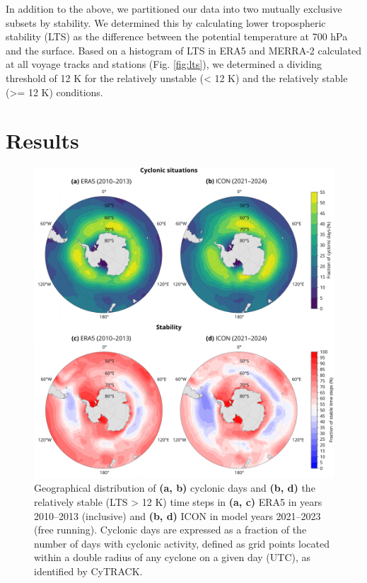 \documentclass[12pt,a4paper]{article}
\begin{document}
In addition to the above, we partitioned our data into two mutually exclusive
subsets by stability. We determined this by calculating lower tropospheric
stability (LTS) as the difference between the potential temperature at 700 hPa
and the surface.  Based on a histogram of LTS in ERA5 and MERRA-2 calculated at
all voyage tracks and stations (Fig.  \ref{fig:lts}), we determined a dividing
threshold of 12 K for the relatively unstable (< 12 K) and the relatively
stable (>= 12 K) conditions.

\section{Results}
\label{sec:results}

\begin{figure}[p!]
\centering
\includegraphics[width=\textwidth]{img/cyc_stab_dist.pdf}
\caption{
Geographical distribution of \textbf{(a, b)} cyclonic days and \textbf{(b, d)}
the relatively stable (LTS > 12 K) time steps in \textbf{(a, c)} ERA5 in years
2010--2013 (inclusive) and \textbf{(b, d)} ICON in model years 2021--2023 (free
running). Cyclonic days are expressed as a fraction of the number of days with
cyclonic activity, defined as grid points located within a double radius of any
cyclone on a given day (UTC), as identified by CyTRACK.
}
\label{fig:cyclone-stability}
\end{figure}
\end{document}
